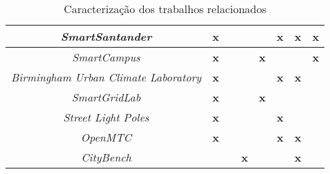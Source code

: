 \begin{landscape}
\begin{table}[htb!]
{\begin{tabular}{|c|c|c|c|c|c|c|l|}
\textit{SmartSantander}                      & \textbf{x}                          & \textbf{}                     & \textbf{}             & \textbf{}                           & \textbf{x}                               & \textbf{x}                    & \multicolumn{1}{c|}{\textbf{x}}                                       \\ \hline
\textit{SmartCampus}                         & \textbf{x}                          & \textbf{}                     & \textbf{}             & \textbf{x}                          & \textbf{}                                & \textbf{}                     & \multicolumn{1}{c|}{\textbf{x}}                                       \\ \hline
\textit{Birmingham Urban Climate Laboratory} & \textbf{x}                          & \textbf{}                     & \textbf{}             & \textbf{}                           & \textbf{x}                               & \textbf{x}                    &                                                                       \\ \hline
\textit{SmartGridLab}                        & \textbf{x}                          & \textbf{}                     & \textbf{}             & \textbf{x}                          & \textbf{}                                & \textbf{}                     &                                                                       \\ \hline
\textit{Street Light Poles}                  & \textbf{x}                          & \multicolumn{1}{l|}{}         & \multicolumn{1}{l|}{} & \multicolumn{1}{l|}{}               & \textbf{x}                               & \multicolumn{1}{l|}{}         &                                                                       \\ \hline
\textit{OpenMTC}                             & \textbf{x}                          & \multicolumn{1}{l|}{}         & \multicolumn{1}{l|}{} & \multicolumn{1}{l|}{}               & \textbf{x}                               & \textbf{x}                    &                                                                       \\ \hline
\textit{CityBench}                           & \multicolumn{1}{l|}{}               & \multicolumn{1}{l|}{}         & \textbf{x}            & \multicolumn{1}{l|}{}               & \multicolumn{1}{l|}{}                    & \textbf{x}                    &                                                                       \\ \hline
\end{tabular}
    }
    \caption{Caracterização dos trabalhos relacionados}
    \label{tab:trabalhos_relacionados}
\end{table}
\vspace*{\fill}
\end{landscape}


